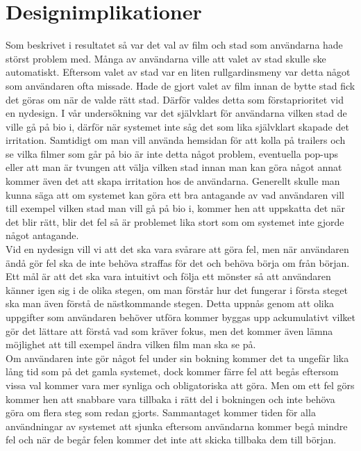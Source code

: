 \documentclass[swedish,a4paper,11pt]{article}
\begin{document}
\section{Designimplikationer}
Som beskrivet i resultatet så var det val av film och stad som användarna hade störst problem med. Många av användarna ville att valet av stad skulle ske automatiskt. Eftersom valet av stad var en liten rullgardinsmeny var detta något som användaren ofta missade. Hade de gjort valet av film innan de bytte stad fick det göras om när de valde rätt stad. Därför valdes detta som förstaprioritet vid en nydesign. I vår undersökning var det självklart för användarna vilken stad de ville gå på bio i, därför när systemet inte såg det som lika självklart skapade det irritation. Samtidigt om man vill använda hemsidan för att kolla på trailers och se vilka filmer som går på bio är inte detta något problem, eventuella pop-ups eller att man är tvungen att välja vilken stad innan man kan göra något annat kommer även det att skapa irritation hos de användarna. Generellt skulle man kunna säga att om systemet kan göra ett bra antagande av vad användaren vill till exempel vilken stad man vill gå på bio i, kommer hen att uppskatta det när det blir rätt, blir det fel så är problemet lika stort som om systemet inte gjorde något antagande. \\
Vid en nydesign vill vi att det ska vara svårare att göra fel, men när användaren ändå gör fel ska de inte behöva straffas för det och behöva börja om från början. Ett mål är att det ska vara intuitivt och följa ett mönster så att användaren känner igen sig i de olika stegen, om man förstår hur det fungerar i första steget ska man även förstå de nästkommande stegen. Detta uppnås genom att olika uppgifter som användaren behöver utföra kommer byggas upp ackumulativt vilket gör det lättare att förstå vad som kräver fokus, men det kommer även lämna möjlighet att till exempel ändra vilken film man ska se på.\\
Om användaren inte gör något fel under sin bokning kommer det ta ungefär lika lång tid som på det gamla systemet, dock kommer färre fel att begås eftersom vissa val kommer vara mer synliga och obligatoriska att göra. Men om ett fel görs kommer hen att snabbare vara tillbaka i rätt del i bokningen och inte behöva göra om flera steg som redan gjorts. Sammantaget kommer tiden för alla användningar av systemet att sjunka eftersom användarna kommer begå mindre fel och när de begår felen kommer det inte att skicka tillbaka dem till början. 
\end{document}
